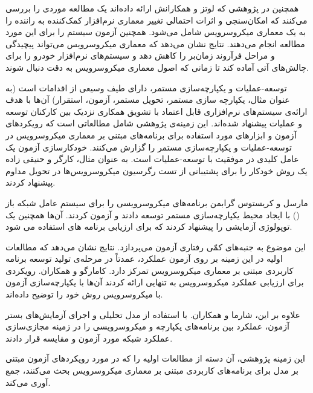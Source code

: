 همچنین در پژوهشی که لوتز و همکارانش ارائه داده‌اند یک مطالعه موردی را بررسی می‌کنند که امکان‌سنجی و اثرات احتمالی تغییر معماری نرم‌افزار کمک‌کننده به راننده را به یک معماری میکروسرویس شامل می‌شود. همچنین آزمون سیستم را برای این مورد مطالعه انجام می‌دهند. نتایج نشان می‌دهد که معماری‌ میکروسرویس می‌تواند پیچیدگی و مراحل فرآروند زمان‌بر را کاهش دهد و سیستم‌های نرم‌افزار خودرو را برای چالش‌های آتی آماده کند تا زمانی که اصول معماری‌ میکروسرویس به دقت دنبال شوند. 

توسعه-عملیات و یکپارچه‌سازی مستمر، دارای طیف وسیعی از اقدامات است (به عنوان مثال، یکپارچه سازی مستمر، تحویل مستمر، آزمون، استقرار) آن‌ها با هدف ارائه‌ی سیستم‌های نرم‌افزاری قابل اعتماد با تشویق همکاری نزدیک بین کارکنان توسعه و عملیات پیشنهاد شده‌اند. این زمینه‌ی پژوهشی شامل مطالعاتی است که رویکردهای آزمون و ابزارهای مورد استفاده برای برنامه‌های مبتنی بر معماری میکروسرویس در توسعه-عملیات و یکپارچه‌سازی مستمر را گزارش می‌کنند. خودکارسازی آزمون یک عامل کلیدی در موفقیت با توسعه-عملیات است. به عنوان مثال، کارگر و حنیفی زاده یک روش خودکار را برای پشتیبانی از تست رگرسیون میکروسرویس‌ها در تحویل مداوم پیشنهاد کردند.

مارسل و کریستوس گرابمن برنامه‌های میکروسرویسی را برای سیستم عامل شبکه باز () با ایجاد محیط یکپارچه‌سازی مستمر توسعه دادند و آزمون کردند. آن‌ها همچنین یک توپولوژی آزمایشی را پیشنهاد کردند که برای ارزیابی برنامه های  استفاده می شود.

این موضوع به جنبه‌های کمّی رفتاری آزمون می‌پردازد. نتایج نشان می‌دهد که مطالعات اولیه در این زمینه‌‌ بر روی آزمون عملکرد، عمدتاً در مرحله‌ی تولید توسعه برنامه کاربردی مبتنی بر معماری میکروسرویس تمرکز دارد. 
کامارگو و همکاران. رویکردی برای ارزیابی عملکرد میکروسرویس به تنهایی ارائه کردند آن‌ها با یکپارچه‌سازی آزمون با میکروسرویس روش خود را توضیح داده‌اند.

علاوه بر این، شارما و همکاران. با استفاده از مدل تحلیلی و اجرای آزمایش‌های بستر آزمون، عملکرد بین برنامه‌های یکپارچه و میکروسرویسی را در زمینه مجازی‌سازی عملکرد شبکه مورد آزمون و مقایسه قرار دادند.

 این زمینه پژوهشی، آن دسته از مطالعات اولیه را که در مورد رویکردهای آزمون مبتنی بر مدل برای برنامه‌های کاربردی مبتنی بر معماری میکروسرویس بحث می‌کنند، جمع آوری می‌کند. 
 
